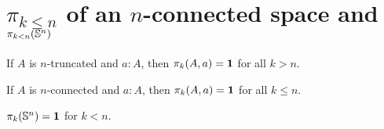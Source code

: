 \documentclass[hott-all.tex]{subfiles}
\begin{document}
\section{\texorpdfstring{$\pi_{k \le n}$}{π\_(k≤n)} of an \texorpdfstring{$n$}{n}-connected space and \texorpdfstring{$\pi_{k < n}(\mathbb{S} ^n)$}{π\_(k<n)(Sⁿ)}}
% 
% 
% 
\begin{lem}
  If $A$ is $n$-truncated and $a:A$, then $\pi_k(A,a)=\mathbf{1}$ for all $k>n$.
\end{lem}
% 
% 
\begin{lem} 
  If $A$ is $n$-connected and $a:A$, then $\pi_k(A,a)=\mathbf{1}$ for all $k\le{}n$.
\end{lem}
% 
% 
\begin{cor}
  $\pi_k(\mathbb{S} ^n) = \mathbf{1}$ for $k < n$.
\end{cor}
% 
\end{document}
